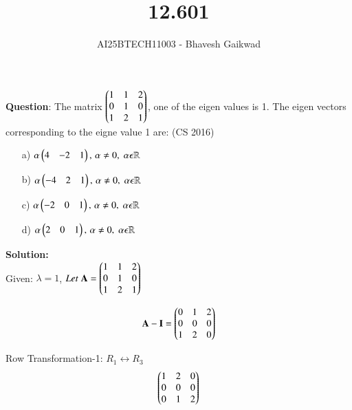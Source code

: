 \documentclass[journal]{IEEEtran}
\begin{document}

\vspace{3cm}

\title{12.601}
\author{AI25BTECH11003 - Bhavesh Gaikwad}
{\let\newpage\relax\maketitle}

\renewcommand{\thefigure}{\theenumi}
\renewcommand{\thetable}{\theenumi}
\setlength{\intextsep}{10pt} 

\renewcommand{\thetable}{\theenumi}


\textbf{Question}: 
The matrix $\begin{pmatrix}1 & 1 & 2 \\ 0 & 1 & 0 \\ 1 & 2 & 1\end{pmatrix}$, one of the eigen values is 1. The eigen vectors corresponding to the eigne value 1 are:
\hfill{(CS 2016)}\\

\begin{itemize}
    \item[a)] $\alpha\begin{pmatrix}4 & -2 & 1\end{pmatrix}, \, \alpha \neq 0, \; \alpha \epsilon \mathbb{R}$
    \item[b)] $\alpha\begin{pmatrix}-4 & 2 & 1\end{pmatrix}, \, \alpha \neq 0, \; \alpha \epsilon \mathbb{R}$
    \item[c)]$\alpha\begin{pmatrix}-2 & 0 & 1\end{pmatrix}, \, \alpha \neq 0, \; \alpha \epsilon \mathbb{R}$
    \item[d)]$\alpha\begin{pmatrix}2 & 0 & 1\end{pmatrix}, \, \alpha \neq 0, \; \alpha \epsilon \mathbb{R}$
\end{itemize}

\bigskip
 
\textbf{Solution:}\\
Given: $\lambda = 1$, $Let \; \mathbf{A} = \begin{pmatrix}1 & 1 & 2 \\ 0 & 1 & 0 \\ 1 & 2 & 1\end{pmatrix}$

\begin{equation}
    \mathbf{A} - \mathbf{I} = \begin{pmatrix}0 & 1 & 2 \\ 0 & 0 & 0 \\ 1 & 2 & 0\end{pmatrix}
\end{equation}

Row Transformation-1: $R_1 \leftrightarrow R_3$
\begin{equation}
\begin{pmatrix}1 & 2 & 0 \\ 0 & 0 & 0 \\ 0 & 1 & 2\end{pmatrix}
\end{equation}
\end{document}
